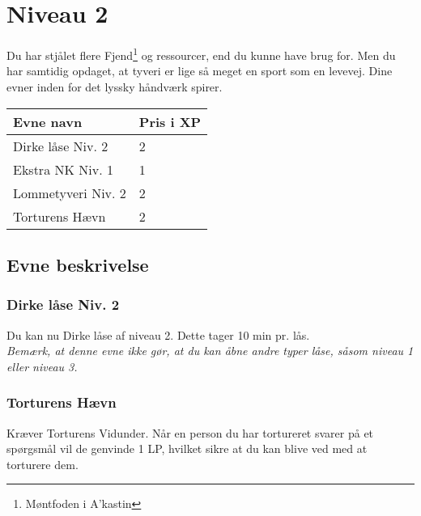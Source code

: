 \chapter{Niveau 2}
Du har stjålet flere Fjend\footnote{Møntfoden i A'kastin} og ressourcer, end du kunne have brug for. Men du har samtidig opdaget, at tyveri er lige så meget en sport som en levevej. Dine evner inden for det lyssky håndværk spirer.

\begin{table}[H]
    \centering
    \begin{tabular}{|p{}|p{}|}
    \rowcolor{cerulean!80}\hline
        Evne navn & Pris i XP \\\hline
         Dirke låse Niv. 2 & 2 \\\hline
         Ekstra NK Niv. 1 & 1 \\\hline
         Lommetyveri Niv. 2 & 2 \\\hline
         Torturens Hævn & 2\\\hline
    \end{tabular}
\end{table}
\section{Evne beskrivelse}

\subsection{Dirke låse Niv. 2}
Du kan nu Dirke låse af niveau 2. Dette tager 10 min pr. lås.\\
\emph{Bemærk, at denne evne ikke gør, at du kan åbne andre typer låse, såsom niveau 1 eller niveau 3.}\\





\subsection{Torturens Hævn}
Kræver Torturens Vidunder. Når en person du har tortureret svarer på et spørgsmål vil de genvinde 1 LP, hvilket sikre at du kan blive ved med at torturere dem. 